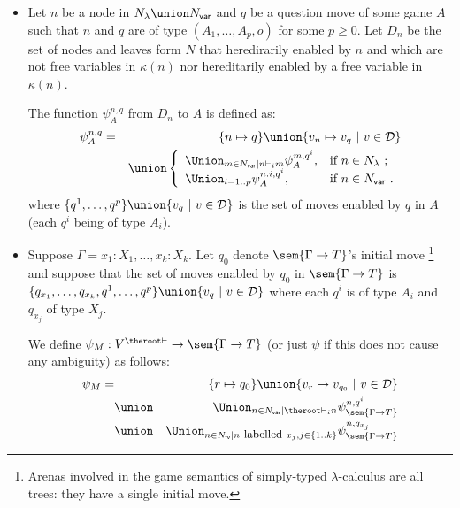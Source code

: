 \begin{definition}\hfill
\label{def:psi mapping}

    \begin{itemize}[-]
    \item Let $n$ be a node in $N_\lambda \union N_{\sf var}$ and $q$ be a question move of some game $A$
such that $n$ and $q$ are of type $(A_1,\ldots,A_p,o)$ for some
$p\geq 0$. Let $D_n$ be the set of nodes and leaves form $N$
that heredirarily enabled by $n$ and which are not free
variables in $\kappa(n)$ nor hereditarily enabled by a free
variable in $\kappa(n)$.

The function $\psi^{n,q}_A$ from $D_n$ to $A$ is defined as:
        \begin{eqnarray*}
        \psi^{n,q}_A &=& \{ n \mapsto q \} \union  \{ v_n \mapsto v_q \ | \ v \in \mathcal{D} \}\\
         &&\union \left\{
                        \begin{array}{ll}
                          \Union_{m \in N_{\sf var} | n \vdash_i m} \psi^{m, q^i}_A, & \hbox{if $n\in N_{\lambda}$\ ;} \\
                          \Union_{i=1..p} \psi^{n.i, q^i}_A, & \hbox{if $n\in N_{\sf var}$\ .}
                        \end{array}
                      \right.
        \end{eqnarray*}
        where $\{ q^1, \ldots, q^p \} \union \{ v_q \ | \ v \in \mathcal{D} \}$ is the set of moves enabled by $q$ in $A$ (each $q^i$ being of type $A_i$).

    \item Suppose $\Gamma = x_1:X_1, \ldots ,
    x_k:X_k$. Let $q_0$ denote $\sem{\Gamma\rightarrow T}$'s
    initial move \footnote{Arenas involved in the game semantics
    of simply-typed $\lambda$-calculus are all trees: they have
    a single initial move.} and suppose that the set of moves
    enabled by $q_0$ in $\sem{\Gamma\rightarrow T}$ is
     $\{ q_{x_1}, \ldots, q_{x_k}, q^1, \ldots, q^p \} \union \{
    v_q \ | \ v \in \mathcal{D} \}$ where each $q^i$ is of type
    $A_i$ and $q_{x_j}$ of type $X_j$.

    We define $\psi_M : V^{\theroot\vdash} \rightarrow
    \sem{\Gamma\rightarrow T}$ (or just $\psi$ if this does not
    cause any ambiguity) as follows:
    \begin{eqnarray*}
     \psi_M = && \{ r \mapsto q_0 \}  \union  \{ v_r \mapsto v_{q_0} \ | \ v \in \mathcal{D} \}\\
& \union& \Union_{n \in N_{\sf var} | \theroot\vdash_i n} \psi^{n, q^i}_\sem{\Gamma\rightarrow T} \\
& \union& \Union_{n \in N_{\sf fv} | n \mbox{ \small labelled } x_j, j \in \{ 1..k \} } \psi^{n, q_{x_j}}_\sem{\Gamma\rightarrow T}
    \end{eqnarray*}
    \end{itemize}
\end{definition}

